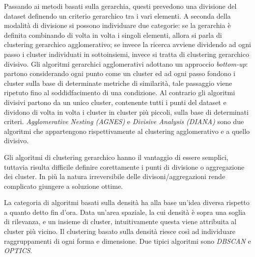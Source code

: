 Passando ai metodi basati sulla gerarchia, questi prevedono una divisione del dataset definendo un criterio gerarchico tra i vari elementi.
A seconda della modalità di divisione si possono individuare due categorie: se la gerarchia è definita combinando di volta in volta i singoli elementi,
allora si parla di clustering gerarchico agglomerativo; se invece la ricerca avviene dividendo ad ogni passo i cluster individuati in sottoinsiemi, invece
si tratta di clustering gerarchico divisivo.
Gli algoritmi gerarchici agglomerativi adottano un approccio \textit{bottom-up}: partono considerando ogni punto come un cluster ed ad ogni passo fondono i cluster sulla base di determinate metriche
di similarità, tale passaggio viene ripetuto fino al soddidfacimento di una condizione.
Al contrario gli algoritmi divisivi partono da un unico cluster, contenente tutti i punti del dataset e dividono di volta
in volta i cluster in cluster più piccoli, sulla base di determinati criteri.
\textit{Agglomerative Nesting (AGNES)}\cite{kaufman2008agglomerative} e \textit{Divisive Analysis (DIANA)}\cite{kaufman2008divisive} sono due algoritmi che
appartengono rispettivamente al clustering agglomerativo e a quello divisivo.

Gli algoritmi di clustering gerarchico hanno il vantaggio di essere semplici, tuttavia risulta
difficile definire corettamente i punti di divisione o aggregazione dei cluster.
In più la natura irreversibile delle divisoni/aggregazioni rende complicato giungere a soluzione ottime.

La categoria di algoritmi basati sulla densità ha alla base un'idea diversa rispetto a quanto detto fin d'ora.
Data un'area spaziale, la cui densità è sopra una soglia di rilevanza, e un insieme di cluster, intuitivamente questa viene attribuita al cluster più vicino.
Il clustering basato sulla densità riesce così ad individuare raggruppamenti di ogni forma e dimensione.
Due tipici algoritmi sono \textit{DBSCAN}\cite{ester1996density} e \textit{OPTICS}\cite{ankerst1999optics}.

